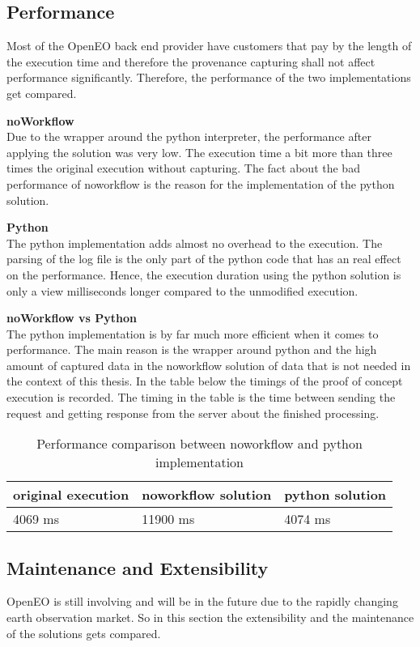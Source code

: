\documentclass[draft,final]{vutinfth} %
\begin{document}
\subsection{Performance}\label{NvsP:Performance}
Most of the OpenEO back end provider have customers that pay by the length of the execution time and therefore the provenance capturing shall not affect performance significantly. Therefore, the performance of the two implementations get compared.

\textbf{noWorkflow} \\
Due to the wrapper around the python interpreter, the performance after applying the solution was very low. The execution time a bit more than three times the original execution without capturing. The fact about the bad performance of noworkflow is the reason for the implementation of the python solution. 

\textbf{Python} \\
The python implementation adds almost no overhead to the execution. The parsing of the log file is the only part of the python code that has an real effect on the performance. Hence, the execution duration using the python solution is only a view milliseconds longer compared to the unmodified execution.  

\textbf{noWorkflow vs Python} \\
The python implementation is by far much more efficient when it comes to performance. The main reason is the wrapper around python and the high amount of captured data in the noworkflow solution of data that is not needed in the context of this thesis. In the table below the timings of the proof of concept execution is recorded. The timing in the table is the time between sending the request and getting response from the server about the finished processing. 

\begin{table}[]
	\caption{Performance comparison between noworkflow and python implementation}
	\centering
	\begin{tabular}{l|l|l}
		\textbf{original execution} & \textbf{noworkflow solution} & \textbf{python solution} \\ \hline
		4069 ms & 11900 ms & 4074 ms \\ 
	\end{tabular}
	\label{Tab:noworkflow}
\end{table}

\subsection{Maintenance and Extensibility}\label{NvsP:Maintenance and Extensibility}
OpenEO is still involving and will be in the future due to the rapidly changing earth observation market. So in this section the extensibility and the maintenance of the solutions gets compared. 
\end{document}

